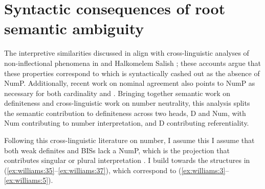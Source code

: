 \documentclass[output=paper,
modfonts
]{langscibook}
\begin{document}
\section{Syntactic consequences of root semantic ambiguity}\label{sec:williams:4}

The interpretive similarities discussed in  align with cross-linguistic analyses of non-inflectional  phenomena in  \citep{Deprez2005} and Halkomelem Salish \citep{wiltschko2008}; these accounts argue that these properties correspond to  which is syntactically cashed out as the absence of NumP. Additionally, recent work on  nominal agreement \citep{Landau2016} also points to NumP as necessary for both cardinality and . Bringing together semantic work on definiteness and cross-linguistic work on number neutrality, this analysis splits the semantic contribution to definiteness across two heads, D and Num, with Num contributing to number interpretation, and D contributing referentiality. 

Following this cross-linguistic literature on number, I assume this I assume that both weak definites and BISs lack a NumP, which is the projection that contributes singular or plural interpretation \citep{ritter1991,ritter1992, ritter1995}. I build towards the structures in (\ref{ex:williams:35}--\ref{ex:williams:37}), which correspond to (\ref{ex:williams:3}--\ref{ex:williams:5}). 
\end{document}
